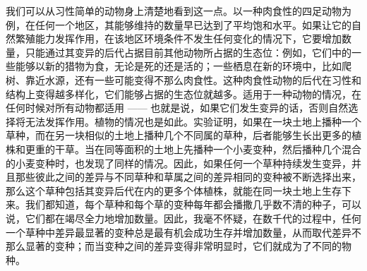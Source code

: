 \documentclass{article}
\begin{document}
我们可以从习性简单的动物身上清楚地看到这一点。以一种肉食性的四足动物为例，在任何一个地区，其能够维持的数量早已达到了平均饱和水平。如果让它的自然繁殖能力发挥作用，在该地区环境条件不发生任何变化的情况下，它要增加数量，只能通过其变异的后代占据目前其他动物所占据的生态位：例如，它们中的一些能够以新的猎物为食，无论是死的还是活的；一些栖息在新的环境中，比如爬树、靠近水源，还有一些可能变得不那么肉食性。这种肉食性动物的后代在习性和结构上变得越多样化，它们能够占据的生态位就越多。适用于一种动物的情况，在任何时候对所有动物都适用 —— 也就是说，如果它们发生变异的话，否则自然选择将无法发挥作用。植物的情况也是如此。实验证明，如果在一块土地上播种一个草种，而在另一块相似的土地上播种几个不同属的草种，后者能够生长出更多的植株和更重的干草。当在同等面积的土地上先播种一个小麦变种，然后播种几个混合的小麦变种时，也发现了同样的情况。因此，如果任何一个草种持续发生变异，并且那些彼此之间的差异与不同草种和草属之间的差异相同的变种被不断选择出来，那么这个草种包括其变异后代在内的更多个体植株，就能在同一块土地上生存下来。我们都知道，每个草种和每个草的变种每年都会播撒几乎数不清的种子，可以说，它们都在竭尽全力地增加数量。因此，我毫不怀疑，在数千代的过程中，任何一个草种中差异最显著的变种总是最有机会成功生存并增加数量，从而取代差异不那么显著的变种；而当变种之间的差异变得非常明显时，它们就成为了不同的物种。 
\end{document}
